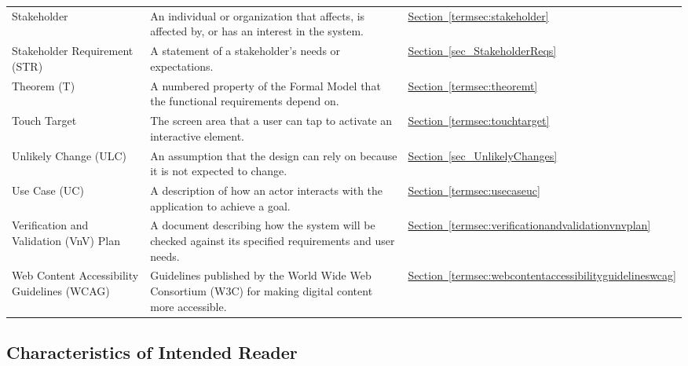 \documentclass[10pt]{article}
\newcommand{\termloc}[1]{\hyperlink{term:#1}{Section~\ref*{termsec:#1}}}
\newcommand{\termlocref}[1]{\hyperref[#1]{Section~\ref*{#1}}}
\begin{document}
\begin{longtable}{@{}p{} p{} p{}@{}}
Stakeholder &
An individual or organization that affects, is affected by, or has an interest in the system. &
\termloc{stakeholder} \\

Stakeholder Requirement (STR) &
A statement of a stakeholder's needs or expectations. &
\termlocref{sec_StakeholderReqs} \\

Theorem (T) &
A numbered property of the Formal Model that the functional requirements depend on. &
\termloc{theoremt} \\

Touch Target &
The screen area that a user can tap to activate an interactive element. &
\termloc{touchtarget} \\

Unlikely Change (ULC) &
An assumption that the design can rely on because it is not expected to change. &
\termlocref{sec_UnlikelyChanges} \\

Use Case (UC) &
A description of how an actor interacts with the application to achieve a goal. &
\termloc{usecaseuc} \\

Verification and Validation (VnV) Plan &
A document describing how the system will be checked against its specified requirements and user needs. &
\termloc{verificationandvalidationvnvplan} \\

Web Content Accessibility Guidelines (WCAG) &
Guidelines published by the World Wide Web Consortium (W3C) for making digital content more accessible. &
\termloc{webcontentaccessibilityguidelineswcag} \\

\end{longtable}

\subsection{Characteristics of Intended Reader} \label{sec_IntendedReader}
\end{document}
